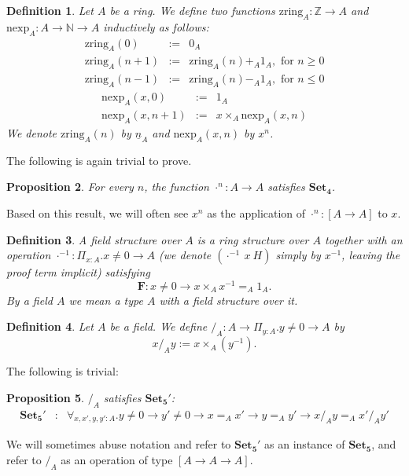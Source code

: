 \documentclass{article}
\newtheorem{definition}{Definition}[section]
\newtheorem{proposition}[definition]{Proposition}
\newcommand{\Z}{{\mathbb Z}}
\newcommand{\zring}{\ensuremath{\mathrm{zring}}}
\newcommand{\nexp}{\ensuremath{\mathrm{nexp}}}
\newcommand{\nat}{{\mathbb N}}
\newcommand{\axiom}[1]{\ensuremath{\mathbf{#1}}}
\begin{document}
\begin{definition} Let $A$ be a ring.  We define two functions
$\zring_A:\Z\to A$ and $\nexp_A:A\to\nat\to A$ inductively as follows:
\begin{eqnarray}
\label{zring:0}
 \zring_A(0) & := & 0_A\\
\label{zring:pos}
 \zring_A(n+1) & := & \zring_A(n)+_A 1_A,\mbox{ for $n\geq 0$}\\
\label{zring:neg}
 \zring_A(n-1) & := & \zring_A(n)-_A 1_A,\mbox{ for $n\leq 0$}
\end{eqnarray}
\begin{eqnarray}
\label{nexp:zero}
 \nexp_A(x,0) & := & 1_A\\
\label{nexp:suc}
 \nexp_A(x,n+1) & := & x\times_A\nexp_A(x,n)
\end{eqnarray}
We denote $\zring_A(n)$ by $\underline n_A$ and $\nexp_A(x,n)$ by $x^n$.
\end{definition}

The following is again trivial to prove.
\begin{proposition} For every $n$, the function $\cdot^n:A\to A$ satisfies
\axiom{Set_4}.
\end{proposition}

Based on this result, we will often see $x^n$ as the application of
$\cdot^n:[A\to A]$ to $x$.

\begin{definition}
A \emph{field structure} over $A$ is a ring structure over $A$ together with
an operation $\cdot^{-1}:\Pi_{x:A}.x\neq 0\to A$ (we denote
$(\cdot^{-1}\ x\ H)$ simply by $x^{-1}$, leaving the proof term implicit)
satisfying
\[\axiom{F} : x\neq 0 \to x\times_A x^{-1}=_A 1_A.\]
By a field $A$ we mean a type $A$ with a field structure over it.
\end{definition}

\begin{definition} Let $A$ be a field.  We define
$/_A:A\to\Pi_{y:A}.y\neq 0\to A$ by \[x/_A y:= x\times_A(y^{-1}).\]
\end{definition}

The following is trivial:

\begin{proposition} $/_A$ satisfies \axiom{Set_5'}:
\begin{eqnarray*}
\axiom{Set_5'} & : & \forall_{x,x',y,y':A}.
 y\neq 0\to y'\neq 0\to x=_A x'\to y=_A y'\to x/_A y=_A x'/_A y'
\end{eqnarray*}
\end{proposition}
We will sometimes abuse notation and refer to \axiom{Set_5'} as an
instance of \axiom{Set_5}, and refer to $/_A$ as an operation of type
$[A\to A\to A]$.
\end{document}
